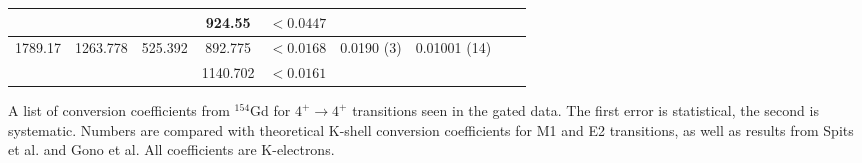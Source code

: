 \begin{landscape}
\begin{longtable}{c|c|c|c|c|c|c|c|c}
        &  &  & 924.55 & $<0.0447$ & & &  \\ \hline
        1789.17 & 1263.778 & 525.392 & 892.775 & $<0.0168$ & 0.0190 (3) & 0.01001 (14) &  \\
        &  &  & 1140.702 & $<0.0161$ & & &  \\
        \bottomrule
    \end{longtable}
    \item{A list of conversion coefficients from $^{154}$Gd for $4^+\rightarrow 4^+$ transitions seen in the gated data. The first error is statistical, the second is systematic. Numbers are compared with theoretical K-shell conversion coefficients for M1 and E2 transitions, as well as results from Spits et al.\citep{spits96:_154gd} and Gono et al.\citep{gono74:_154gd_e0} All coefficients are K-electrons.}
\end{landscape}
